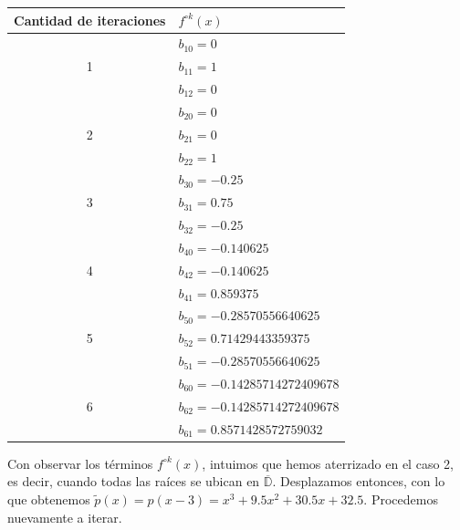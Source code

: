 \documentclass[oneside,11pt]{book}
\theoremstyle{definition}
\theoremstyle{plain}
\theoremstyle{remark}
\begin{document}
\begin{center}
\begin{tabular}{ |c | l | }
\hline
 Cantidad de iteraciones & $f^{\circ k}(x)$\\
 \hline 
& $b_{10}= 0$ \\
1 & $b_{11}= 1$   \\ 
& $b_{12}= 0$ \\  
 \hline 
& $b_{20}= 0$ \\
2 & $b_{21}= 0$ \\ 
& $b_{22}= 1$ \\
\hline
& $b_{30}= -0.25$ \\
3 & $b_{31}= 0.75$ \\ 
& $b_{32}= -0.25$\\
\hline
& $b_{40}= -0.140625$ \\
4 & $b_{42}= -0.140625$  \\ 
& $b_{41}= 0.859375$ \\
\hline
& $b_{50}= -0.28570556640625$ \\
5 & $b_{52}= 0.71429443359375$   \\ 
& $b_{51}= -0.28570556640625$ \\
\hline
& $b_{60}= -0.14285714272409678$ \\
6 & $b_{62}= -0.14285714272409678$  \\
& $b_{61}= 0.8571428572759032$ \\
\hline
\end{tabular}
\end{center}
\bigskip

Con observar los t\'erminos $f^{\circ k}(x)$, 
intuimos que hemos aterrizado en el caso 2, es decir, cuando todas las ra\'ices se ubican en $\overline{\mathbb{D}}$. 
Desplazamos entonces, con lo que obtenemos $\tilde{p}(x)=p(x-3)=x^3+9.5x^2+30.5x+32.5$.
Procedemos nuevamente a iterar.
\end{document}
